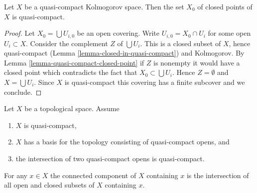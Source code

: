 \begin{lemma}
\label{lemma-closed-points-quasi-compact}
Let $X$ be a quasi-compact Kolmogorov space. Then the set $X_0$ of
closed points of $X$ is quasi-compact.
\end{lemma}

\begin{proof}
Let $X_0 = \bigcup U_{i, 0}$ be an open covering.
Write $U_{i, 0} = X_0 \cap U_i$ for some open $U_i \subset X$.
Consider the complement $Z$ of $\bigcup U_i$. This is a closed subset of
$X$, hence quasi-compact (Lemma \ref{lemma-closed-in-quasi-compact})
and Kolmogorov. By Lemma \ref{lemma-quasi-compact-closed-point}
if $Z$ is nonempty it would have a closed
point which contradicts the fact that $X_0 \subset \bigcup U_i$.
Hence $Z = \emptyset$ and $X = \bigcup U_i$. Since $X$ is quasi-compact
this covering has a finite subcover and we conclude.
\end{proof}

\begin{lemma}
\label{lemma-connected-component-intersection}
Let $X$ be a topological space.
Assume
\begin{enumerate}
\item $X$ is quasi-compact,
\item $X$ has a basis for the topology consisting of quasi-compact opens, and
\item the intersection of two quasi-compact opens is quasi-compact.
\end{enumerate}
For any $x \in X$ the connected component of $X$ containing
$x$ is the intersection of all open and closed subsets
of $X$ containing $x$.
\end{lemma}

